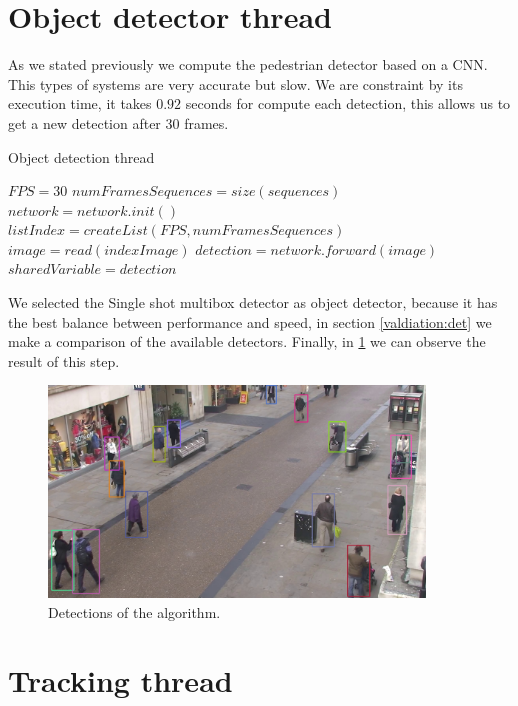 \section{Object detector thread}



As we stated previously we compute the pedestrian detector based on a CNN. This types of systems are very accurate but slow. We are constraint by its execution time, it takes $0.92$ seconds for compute each detection, this allows us to get a new detection after $30$ frames. 

\begin{algorithm}
\caption{Object detection thread}\label{euclid}
\begin{algorithmic}[1]

\State $FPS = 30$
\State $numFramesSequences = size(sequences)$
\State $network = network.init()$
\State $listIndex = createList(FPS,numFramesSequences)$
\State $image = read(indexImage)$
\State $detection = network.forward(image)$
\State $sharedVariable = detection$
\EndFor
\EndProcedure
\end{algorithmic}
\end{algorithm}

We selected the Single shot multibox detector as object detector, because it has the best balance between performance and speed, in section \ref{valdiation:det} we make a comparison of the available detectors. Finally, in \ref{objectDetector1} we can observe the result of this step.


\begin{figure}[H]
\centering         
\includegraphics[width=10cm]{intro/deteccions.jpg}
\caption{Detections of the algorithm.} \label{objectDetector1}
\end{figure}


\section{Tracking thread}




